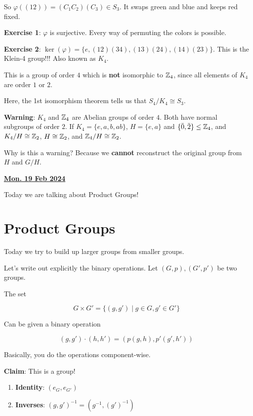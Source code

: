 \documentclass[12pt]{article}
\renewcommand{\date}[1]{\underline{\bf #1}}
\begin{document}
So $\varphi((12)) = (C_1 C_2)(C_3) \in S_3$. It swaps green and blue and keeps
red fixed.

{\bf Exercise 1}: $\varphi$ is surjective. Every way of permuting the colors is
possible.

{\bf Exercise 2}: $\ker(\varphi) = \{e, (12)(34), (13)(24), (14)(23) \}$. This
is the Klein-4 group!!! Also known as $K_4$.

This is a group of order $4$ which is {\bf not} isomorphic to ${\mathbb Z}_4$, since all
elements of $K_4$ are order $1$ or $2$.

Here, the 1st isomorphism theorem tells us that $S_4 / K_4 \cong S_3$.

{\bf Warning}: $K_4$ and ${\mathbb Z}_4$ are Abelian groups of order $4$. Both have
normal subgroups of order $2$. If $K_4 = \{e, a, b, ab\}$, $H = \{e, a\}$ and
$\{\bar 0, \bar 2\} \le {\mathbb Z}_4$, and $K_4 / H \cong {\mathbb Z}_2$, $H \cong {\mathbb Z}_2$, and
${\mathbb Z}_4 / H \cong {\mathbb Z}_2$.

Why is this a warning? Because we {\bf cannot} reconstruct the original group
from $H$ and $G / H$.


\date{Mon. 19 Feb 2024}

Today we are talking about Product Groups!

\section{Product Groups}

Today we try to build up larger groups from smaller groups.

Let's write out explicitly the binary operations. Let $(G, p), (G', p')$ be two
groups.

The set

\[
  G \times G' = \{(g, g') \mid g \in G, g' \in G' \}
\]

Can be given a binary operation

\[
  (g, g') \cdot (h, h') = (p(g, h), p'(g', h'))
\]

Basically, you do the operations component-wise.

{\bf Claim}: This is a group!

\begin{enumerate}
  \item {\bf Identity}: $(e_G, e_{G'})$
  \item {\bf Inverses}: $(g, g')^{-1} = (g^{-1}, (g')^{-1})$
\end{enumerate}
\end{document}
